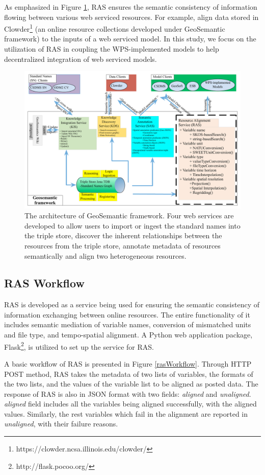 \documentclass[review]{elsarticle}
\begin{document}
As emphasized in Figure \ref{geosemantic}, RAS ensures the semantic consistency of information flowing between various web serviced resources. For example, align data stored in Clowder\footnote{https://clowder.ncsa.illinois.edu/clowder/} (an online resource collections developed under GeoSemantic framework) to the inputs of a web serviced model. In this study, we focus on the utilization of RAS in coupling the WPS-implemented models to help decentralized integration of web serviced models.

\begin{figure}[!htbp]
\centering
\includegraphics[scale=0.5]{../figures/geosemantic.pdf}
\caption{The architecture of GeoSemantic framework. Four web services are developed to allow users to import or ingest the standard names into the triple store, discover the inherent relationships between the resources from the triple store, annotate metadata of resources semantically and align two heterogeneous resources.}
\label{geosemantic}
\end{figure}

\subsection{RAS Workflow}RAS is developed as a service being used for ensuring the semantic consistency of information exchanging between online resources. The entire functionality of it includes semantic mediation of variable names, conversion of mismatched units and file type, and tempo-spatial alignment. A Python web application package, Flask\footnote{http://flask.pocoo.org/}, is utilized to set up the service for RAS.

A basic workflow of RAS is presented in Figure \ref{rasWorkflow}. Through HTTP POST method, RAS takes the metadata of two lists of variables, the formats of the two lists, and the values of the variable list to be aligned as posted data. The response of RAS is also in JSON format with two fields: \textit{aligned} and \textit{unaligned}. \textit{aligned} field includes all the variables being aligned successfully, with the aligned values. Similarly, the rest variables which fail in the alignment are reported in \textit{unaligned}, with their failure reasons.
\end{document}
